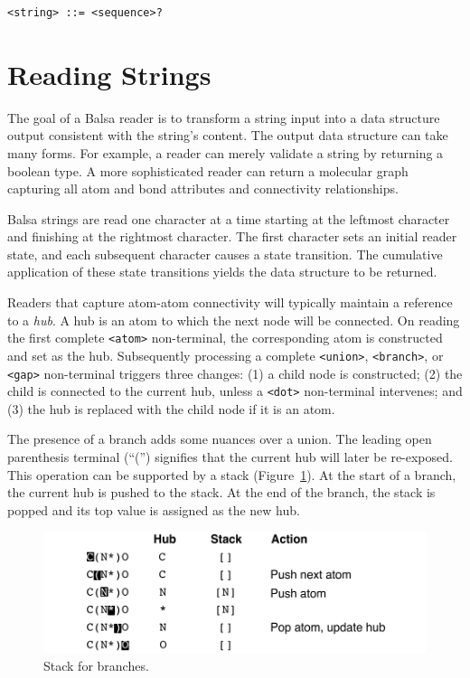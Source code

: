 \documentclass{article}
\def\ttt{\texttt}
\begin{document}
\begin{lstlisting}
<string> ::= <sequence>?
\end{lstlisting}

\section*{Reading Strings}
\label{reading-strings}

The goal of a Balsa reader is to transform a string input into a data structure output consistent with the string's content. The output data structure can take many forms. For example, a reader can merely validate a string by returning a boolean type. A more sophisticated reader can return a molecular graph capturing all atom and bond attributes and connectivity relationships.

Balsa strings are read one character at a time starting at the leftmost character and finishing at the rightmost character. The first character sets an initial reader state, and each subsequent character causes a state transition. The cumulative application of these state transitions yields the data structure to be returned.

Readers that capture atom-atom connectivity will typically maintain a reference to a \textit{hub}. A hub is an atom to which the next node will be connected. On reading the first complete \ttt{<atom>} non-terminal, the corresponding atom is constructed and set as the hub. Subsequently processing a complete \ttt{<union>}, \ttt{<branch>}, or \ttt{<gap>} non-terminal triggers three changes: (1) a child node is constructed; (2) the child is connected to the current hub, unless a \ttt{<dot>} non-terminal intervenes; and (3) the hub is replaced with the child node if it is an atom.

The presence of a branch adds some nuances over a union. The leading open parenthesis terminal (\enquote{(}) signifies that the current hub will later be re-exposed. This operation can be supported by a stack (Figure~\ref{fig:stack}). At the start of a branch, the current hub is pushed to the stack. At the end of the branch, the stack is popped and its top value is assigned as the new hub.

\begin{figure}
    \centering
    \includegraphics[width=\columnwidth]{stack.pdf}
    \caption{Stack for branches.}
    \label{fig:stack}
\end{figure}
\end{document}
